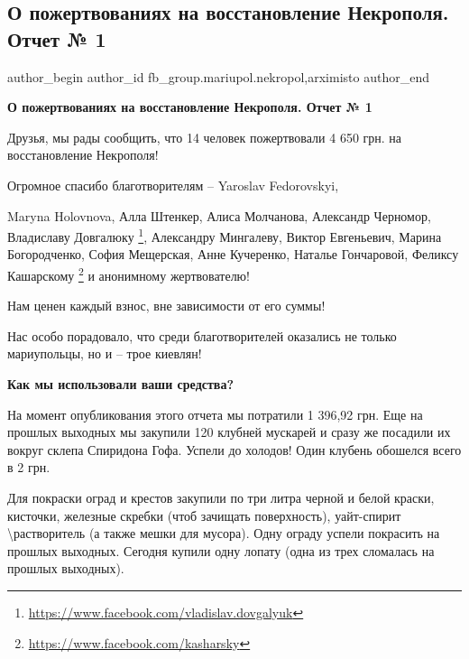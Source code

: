  
 
 
 
 

\subsection{О пожертвованиях на восстановление Некрополя. Отчет № 1}
\label{sec:13_11_2020.fb.fb_group.mariupol.nekropol.1.pozhertvovania_otchet_1}
 
\ifcmt
 author_begin
   author_id fb_group.mariupol.nekropol,arximisto
 author_end
\fi

\textbf{О пожертвованиях на восстановление Некрополя. Отчет № 1}

Друзья, мы рады сообщить, что 14 человек пожертвовали 4 650 грн. на восстановление Некрополя!

Огромное спасибо благотворителям – Yaroslav Fedorovskyi,\par\noindent Maryna Holovnova, Алла
Штенкер, Алиса Молчанова, Александр Черномор, Владиславу Довгалюку%
\footnote{\url{https://www.facebook.com/vladislav.dovgalyuk}}, Александру Мингалеву, Виктор Евгеньевич, Марина
Богородченко, София Мещерская, Анне Кучеренко, Наталье Гончаровой, Феликсу
Кашарскому%
\footnote{\url{https://www.facebook.com/kasharsky}}
и анонимному жертвователю!

Нам ценен каждый взнос, вне зависимости от его суммы!

Нас особо порадовало, что среди благотворителей оказались не только
мариупольцы, но и – трое киевлян! 🙂

\textbf{Как мы использовали ваши средства?}

На момент опубликования этого отчета мы потратили 1 396,92 грн. Еще на прошлых
выходных мы закупили 120 клубней мускарей и сразу же посадили их вокруг склепа
Спиридона Гофа. Успели до холодов! Один клубень обошелся всего в 2 грн.

Для покраски оград и крестов закупили по три литра черной и белой краски,
кисточки, железные скребки (чтоб зачищать поверхность), уайт-спирит
\textbackslash растворитель (а также мешки для мусора). Одну ограду успели
покрасить на прошлых выходных. Сегодня купили одну лопату (одна из трех
сломалась на прошлых выходных).

